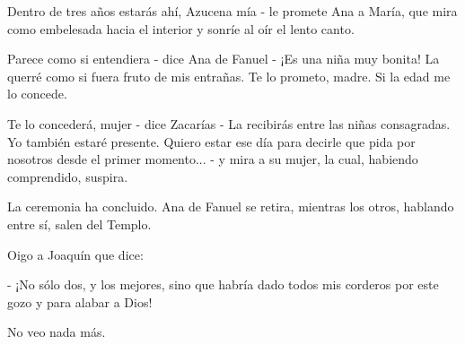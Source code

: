 \documentclass[12pt, twoside, openright]{book} %
\begin{document}
Dentro de tres años estarás ahí, Azucena mía - le promete Ana a María, que mira como embelesada hacia el interior y sonríe al oír el lento canto. 

Parece como si entendiera - dice Ana de Fanuel - ¡Es una niña muy bonita! La querré como si fuera fruto de mis entrañas. Te lo prometo, madre. Si la edad me lo concede. 

Te lo concederá, mujer - dice Zacarías - La recibirás entre las niñas consagradas. Yo también estaré presente. Quiero estar ese día para decirle que pida por nosotros desde el primer momento... - y mira a su mujer, la cual, habiendo comprendido, suspira. 

La ceremonia ha concluido. Ana de Fanuel se retira, mientras los otros, hablando entre sí, salen del Templo. 

Oigo a Joaquín que dice: 

- ¡No sólo dos, y los mejores, sino que habría dado todos mis corderos por este gozo y para alabar a Dios! 

No veo nada más. 
\end{document}
